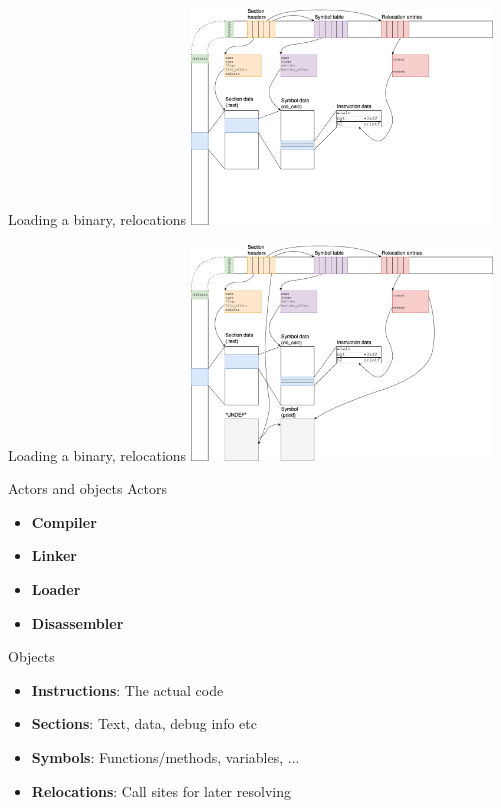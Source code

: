 \documentclass{beamer}
\begin{document}
  \begin{frame}{Loading a binary, relocations}
    \includegraphics[width=8cm]{elf_relocations}
  \end{frame}

  \begin{frame}{Loading a binary, relocations}
    \includegraphics[width=8cm]{elf_undefined_section}
  \end{frame}

  \begin{frame}{Actors and objects}
    Actors
    \begin{itemize}
      \item \textbf{Compiler}
      \item \textbf{Linker}
      \item \textbf{Loader}
      \item \textbf{Disassembler}
    \end{itemize}
    Objects
    \begin{itemize}
      \item \textbf{Instructions}: The actual code
      \item \textbf{Sections}: Text, data, debug info etc
      \item \textbf{Symbols}: Functions/methods, variables, ...
      \item \textbf{Relocations}: Call sites for later resolving
    \end{itemize}

\end{frame}
\end{document}
